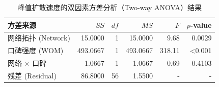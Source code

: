 \begin{table}[H]
    \centering
    \caption{峰值扩散速度的双因素方差分析（Two-way ANOVA）结果}
    \label{tab:anova_speed}
    \begin{tabular}{lrrrrr}
        \toprule
        方差来源 & $SS$ & $df$ & $MS$ & $F$ & $p$-value \\
        \midrule
        网络拓扑 (Network) & 15.0000 & 1 & 15.0000 & 9.68 & 0.0029 \\
        口碑强度 (WOM) & 493.0667 & 1 & 493.0667 & 318.11 & <0.001 \\
        网络 $\times$ 口碑 & 1.0667 & 1 & 1.0667 & 0.69 & 0.4103 \\
        残差 (Residual) & 86.8000 & 56 & 1.5500 & - & - \\
        \bottomrule
    \end{tabular}
\end{table}